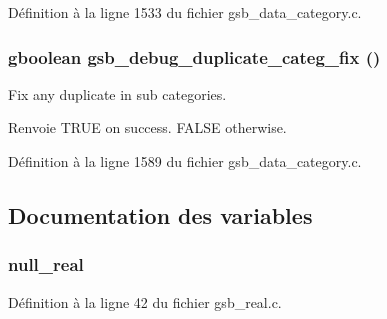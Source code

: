 Définition à la ligne 1533 du fichier gsb\_\-data\_\-category.c.

\subsubsection[{gsb\_\-debug\_\-duplicate\_\-categ\_\-fix}]{\setlength{\rightskip}{0pt plus 5cm}gboolean gsb\_\-debug\_\-duplicate\_\-categ\_\-fix ()}\label{gsb__data__category_8c_adc32170e6ce2e5c802d70dc7e0e43085}
Fix any duplicate in sub categories.

\begin{DoxyReturn}{Renvoie}
TRUE on success. FALSE otherwise. 
\end{DoxyReturn}


Définition à la ligne 1589 du fichier gsb\_\-data\_\-category.c.



\subsection{Documentation des variables}
\subsubsection[{null\_\-real}]{ {\bf null\_\-real}}\label{gsb__data__category_8c_a26f304bec3fdc0651b9aa8765d4de3c6}


Définition à la ligne 42 du fichier gsb\_\-real.c.

